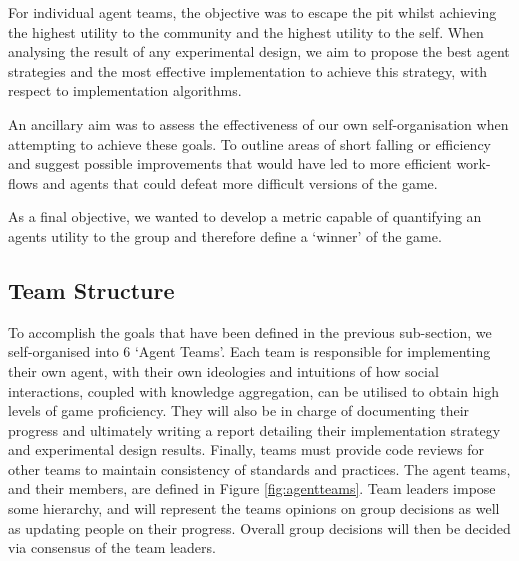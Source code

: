 For individual agent teams, the objective was to escape the pit whilst achieving the highest utility to the community and the highest utility to the self. When analysing the result of any experimental design, we aim to propose the best agent strategies and the most effective implementation to achieve this strategy, with respect to implementation algorithms. 

An ancillary aim was to assess the effectiveness of our own self-organisation when attempting to achieve these goals. To outline areas of short falling or efficiency and suggest possible improvements that would have led to more efficient work-flows and agents that could defeat more difficult versions of the game. 

As a final objective, we wanted to develop a metric capable of quantifying an agents utility to the group and therefore define a `winner' of the game. 



\subsection{Team Structure}\label{sec:team struct}

To accomplish the goals that have been defined in the previous sub-section, we self-organised into 6 `Agent Teams'. Each team is responsible for implementing their own agent, with their own ideologies and intuitions of how social interactions, coupled with knowledge aggregation, can be utilised to obtain high levels of game proficiency. They will also be in charge of documenting their progress and ultimately writing a report detailing their implementation strategy and experimental design results. Finally, teams must provide code reviews for other teams to maintain consistency of standards and practices. The agent teams, and their members, are defined in Figure \ref{fig:agentteams}. Team leaders impose some hierarchy, and will represent the teams opinions on group decisions as well as updating people on their progress. Overall group decisions will then be decided via consensus of the team leaders. 

